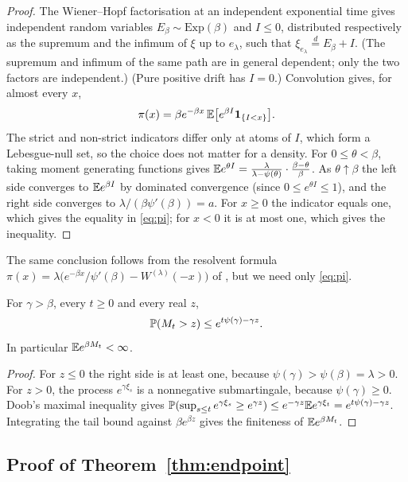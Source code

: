 \documentclass[11pt,a4paper]{article}
\begin{document}
\begin{proof}
The Wiener--Hopf factorisation at an independent exponential time \cite[Section~2.1]{KKR2012} gives independent random variables $E_\beta\sim\mathrm{Exp}(\beta)$ and $I\le0$, distributed respectively as the supremum and the infimum of $\xi$ up to $e_\lambda$, such that $\xi_{e_\lambda}\overset d=E_\beta+I$. (The supremum and infimum of the same path are in general dependent; only the two factors are independent.) (Pure positive drift has $I=0$.) Convolution gives, for almost every $x$,
\[
 \pi(x)=\beta e^{-\beta x}\,\mathbb E\big[e^{\beta I}\mathbf 1_{\{I<x\}}\big].
\]
The strict and non-strict indicators differ only at atoms of $I$, which form a Lebesgue-null set, so the choice does not matter for a density. For $0\le\theta<\beta$, taking moment generating functions gives $\mathbb E e^{\theta I}=\frac{\lambda}{\lambda-\psi(\theta)}\cdot\frac{\beta-\theta}{\beta}$. As $\theta\uparrow\beta$ the left side converges to $\mathbb E e^{\beta I}$ by dominated convergence (since $0\le e^{\theta I}\le1$), and the right side converges to $\lambda/(\beta\psi'(\beta))=a$. For $x\ge0$ the indicator equals one, which gives the equality in \eqref{eq:pi}; for $x<0$ it is at most one, which gives the inequality.
\end{proof}

The same conclusion follows from the resolvent formula $\pi(x)=\lambda\big(e^{-\beta x}/\psi'(\beta)-W^{(\lambda)}(-x)\big)$ of \cite[Theorem~2.7(iv)]{KKR2012}, but we need only \eqref{eq:pi}.

\begin{lemma}\label{lem:doob}
For $\gamma>\beta$, every $t\ge0$ and every real $z$,
\begin{equation}\label{eq:doob}
 \mathbb P(M_t>z)\le e^{t\psi(\gamma)-\gamma z}.
\end{equation}
In particular $\mathbb E e^{\beta M_t}<\infty$.
\end{lemma}

\begin{proof}
For $z\le0$ the right side is at least one, because $\psi(\gamma)>\psi(\beta)=\lambda>0$. For $z>0$, the process $e^{\gamma\xi_s}$ is a nonnegative submartingale, because $\psi(\gamma)\ge0$. Doob's maximal inequality gives $\mathbb P(\sup_{s\le t}e^{\gamma\xi_s}\ge e^{\gamma z})\le e^{-\gamma z}\mathbb E e^{\gamma\xi_t}=e^{t\psi(\gamma)-\gamma z}$. Integrating the tail bound against $\beta e^{\beta z}$ gives the finiteness of $\mathbb E e^{\beta M_t}$.
\end{proof}

\subsection{Proof of Theorem~\ref{thm:endpoint}}
\end{document}
